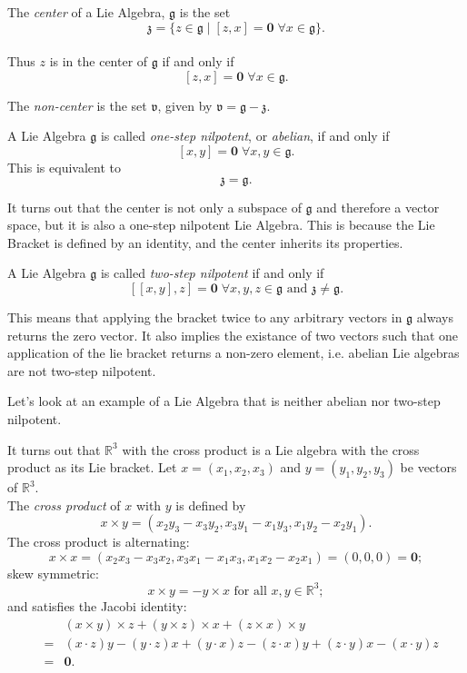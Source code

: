 \documentclass[11 pt]{article}
\newcommand{\br}[2]{\left[#1,#2\right]}
\newcommand{\R}{\mathbb{R}}
\newcommand{\fg}{\mathfrak{g}}
\newcommand{\fz}{\mathfrak{z}}
\newcommand{\fv}{\mathfrak{v}}
\newcommand{\zvec}{\mathbf{0}}
\newcommand{\RR}{\mathbb{R}}
\begin{document}
\begin{definition}
    The \emph{center} of a Lie Algebra, $\fg$ is the set
    \\\[\fz=\{z \in \fg \mid [z,x]
    = \zvec \; \forall x \in \fg\}.\]
    \\Thus $z$ is in the center of $\fg$ if and only if
    \\\[[z,x] = \zvec \; \forall x \in \fg.\]

    The \emph{non-center} is the set $\fv$, given by $\fv = \fg - \fz$.
\end{definition}

\begin{definition}
    A Lie Algebra $\fg$ is called \emph{one-step nilpotent}, or \emph{abelian}, if and only if
    \[\br{x}{y} = \zvec \; \forall x,y \in \fg. \]
    This is equivalent to \[\fz = \fg.\]
\end{definition}

It turns out that the center is not only a subspace of $\fg$ and therefore a
vector space, but it is also a one-step nilpotent Lie Algebra.  This is
because the Lie Bracket is defined by an identity, and the center inherits its
properties.

\begin{definition}
    A Lie Algebra $\fg$ is called \emph{two-step nilpotent} if and only if
    \[
        [[x,y],z] = \zvec \; \forall x,y,z \in \fg
        \text{ and } \fz \neq \fg.
    \]
\end{definition}
This means that applying the bracket twice to any arbitrary vectors in $\fg$
always returns the zero vector.  It also implies the existance of two vectors
such that one application of the lie bracket returns a non-zero element, i.e.
abelian Lie algebras are not two-step nilpotent.

Let's look at an example of a Lie Algebra that is neither abelian nor two-step
nilpotent.

\begin{example}
    It turns out that $\RR^3$ with the cross product is a Lie algebra with the
    cross product as its Lie bracket.
    Let $x = (x_1, x_2, x_3)$ and $y = (y_1, y_2, y_3)$ be vectors of $\RR^3$.
    \\The \emph{cross product} of $x$ with $y$ is defined by
    $$
    x \times y = (x_2y_3 - x_3y_2, x_3y_1 - x_1y_3, x_1y_2 - x_2y_1).
    $$
    The cross product is alternating:
    $$
    x \times x = (x_2x_3 - x_3x_2, x_3x_1 - x_1x_3, x_1x_2 - x_2x_1)
    = (0, 0, 0)
    = \zvec;
    $$
    skew symmetric:
    $$
    x \times y = - y \times x \text{\ \ for\ all\ } x,y \in \R^3;
    $$
    and satisfies the Jacobi identity:
    \begin{eqnarray*}
    & & (x \times y) \times z + (y \times z) \times x + (z \times x) \times y
    \\ & = &
    (x \cdot z)y - (y \cdot z)x + (y\cdot x)z - (z \cdot x)y +
    (z \cdot y)x - (x \cdot y)z
    \\ & = & \zvec.
    \end{eqnarray*}
\end{example}
\end{document}

